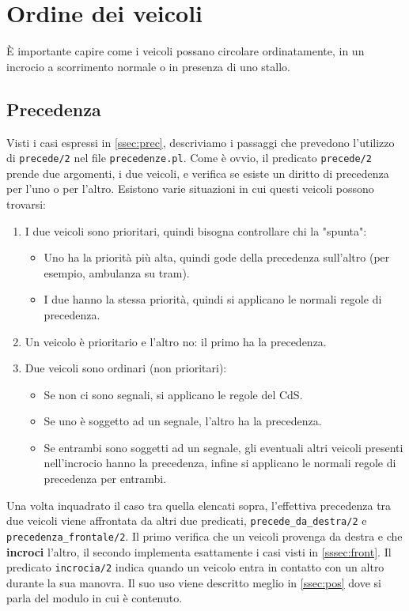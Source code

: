 \restoregeometry

\section{Ordine dei veicoli}
È importante capire come i veicoli possano circolare ordinatamente, in un incrocio a scorrimento normale o in presenza di uno stallo.

\subsection{Precedenza}
Visti i casi espressi in \ref{ssec:prec}, descriviamo i passaggi che prevedono l'utilizzo di \texttt{precede/2} nel file \texttt{precedenze.pl}. Come è ovvio, il predicato \texttt{precede/2} prende due argomenti, i due veicoli, e verifica se esiste un diritto di precedenza per l'uno o per l'altro. Esistono varie situazioni in cui questi veicoli possono trovarsi:
\begin{enumerate}
	\item I due veicoli sono prioritari, quindi bisogna controllare chi la "spunta":
		\begin{itemize}
			\item Uno ha la priorità più alta, quindi gode della precedenza sull'altro (per esempio, ambulanza su tram).
			\item I due hanno la stessa priorità, quindi si applicano le normali regole di precedenza.
		\end{itemize}
	\item Un veicolo è prioritario e l'altro no: il primo ha la precedenza.
	\item Due veicoli sono ordinari (non prioritari):
		\begin{itemize}
			\item Se non ci sono segnali, si applicano le regole del CdS.
			\item Se uno è soggetto ad un segnale, l'altro ha la precedenza.
			\item Se entrambi sono soggetti ad un segnale, gli eventuali altri veicoli presenti nell'incrocio hanno la precedenza, infine si applicano le normali regole di precedenza per entrambi.
		\end{itemize}
\end{enumerate}

Una volta inquadrato il caso tra quella elencati sopra, l'effettiva precedenza tra due veicoli viene affrontata da altri due predicati, \texttt{precede\_da\_destra/2} e \texttt{precedenza\_frontale/2}. Il primo verifica che un veicoli provenga da destra e che \textbf{incroci} l'altro, il secondo implementa esattamente i casi visti in \ref{sssec:front}. Il predicato \texttt{incrocia/2} indica quando un veicolo entra in contatto con un altro durante la sua manovra. Il suo uso viene descritto meglio in \ref{ssec:pos} dove si parla del modulo in cui è contenuto.

